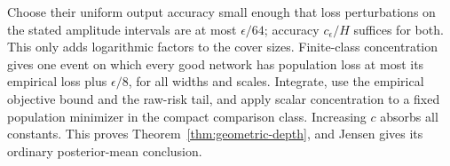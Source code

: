 Choose their uniform output accuracy small enough that loss perturbations on the stated amplitude intervals are at most $\epsilon/64$; accuracy $c_\epsilon/H$ suffices for both. This only adds logarithmic factors to the cover sizes. Finite-class concentration gives one event on which every good network has population loss at most its empirical loss plus $\epsilon/8$, for all widths and scales. Integrate, use the empirical objective bound and the raw-risk tail, and apply scalar concentration to a fixed population minimizer in the compact comparison class. Increasing $c$ absorbs all constants. This proves Theorem~\ref{thm:geometric-depth}, and Jensen gives its ordinary posterior-mean conclusion.
